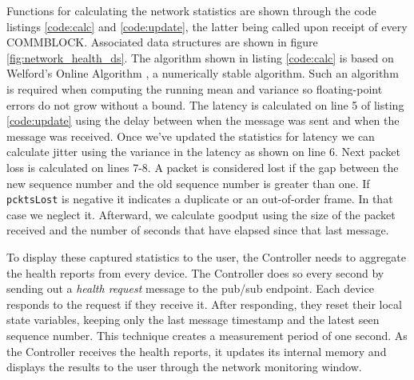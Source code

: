 \documentclass[letterpaper,twocolumn,12pt]{article}
\begin{document}
Functions for calculating the network statistics are shown through the code listings \ref{code:calc} and \ref{code:update}, the latter being called upon receipt of every COMMBLOCK. 
Associated data structures are shown in figure \ref{fig:network_health_ds}. The algorithm shown in listing \ref{code:calc} 
is based on Welford's Online Algorithm \cite{welford_62}, a numerically stable algorithm.
Such an algorithm is required when computing the running mean and variance so floating-point errors do not grow without a bound. The latency is calculated on line 5 of listing \ref{code:update} using the delay between when the message was sent and when the message was received. Once we've updated the statistics for latency we can calculate jitter using the variance in the latency as shown on line 6. Next packet loss is calculated on lines 7-8. A packet is considered lost if the gap between the new sequence number and the old sequence number is greater than one. If \texttt{pcktsLost} is negative it indicates a duplicate or an out-of-order frame. In that case we neglect it.
Afterward, we calculate goodput using the size of the packet received and the number of seconds that have elapsed since that last message.  

To display these captured statistics to the user, the Controller needs to aggregate the health reports from every device. The Controller does so every second by sending out a \textit{health request} message to the pub/sub endpoint. Each device responds to the request if they receive it. After responding, they reset their local state variables, keeping only the last message timestamp and the latest seen sequence number. This technique creates a measurement period of one second. As the Controller receives the health reports, it updates its internal memory and displays the results to the user through the network monitoring window.
\end{document}
